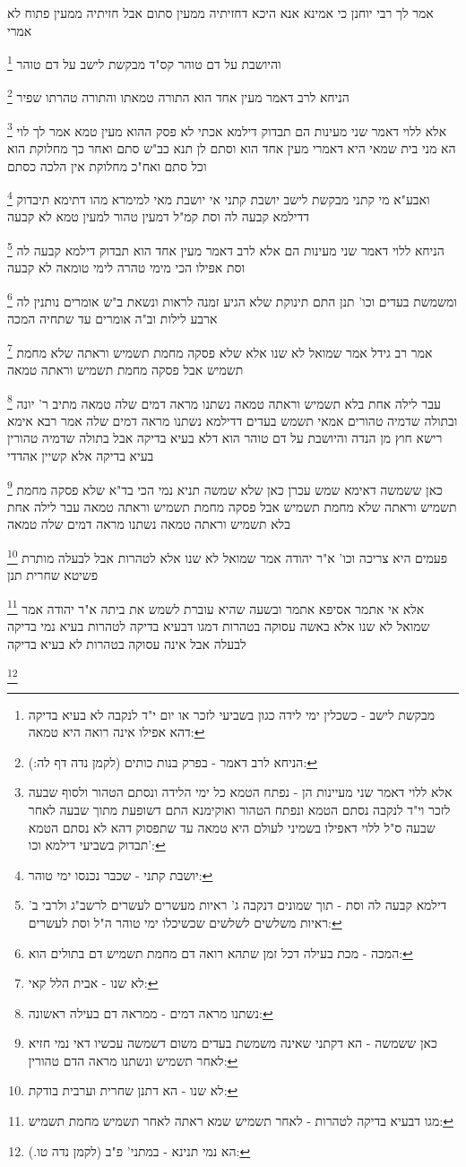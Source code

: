 \documentclass[12pt, openany]{book}
\newcommand{\footnotecomment}[1]{
	\renewcommand\thefootnote{}
	\footnote{#1}}
\newcommand{\commenta}[1]{\footnotecomment{#1}}
\begin{document}
{ אמר לך רבי יוחנן כי אמינא אנא היכא דחזיתיה ממעין סתום אבל חזיתיה ממעין פתוח לא אמרי
\commenta{מבקשת לישב - כשכלין ימי לידה כגון בשביעי לזכר או יום י"ד לנקבה לא בעיא בדיקה דהא אפילו אינה רואה היא טמאה:}
והיושבת על דם טוהר קס"ד מבקשת לישב על דם טוהר 
\commenta{הניחא לרב דאמר - בפרק בנות כותים (לקמן נדה דף לה:):}
הניחא לרב דאמר מעין אחד הוא התורה טמאתו והתורה טהרתו שפיר
\commenta{אלא ללוי דאמר שני מעיינות הן - נפתח הטמא כל ימי הלידה ונסתם הטהור ולסוף שבעה לזכר וי"ד לנקבה נסתם הטמא ונפתח הטהור ואוקימנא התם דשופעת מתוך שבעה לאחר שבעה ס"ל ללוי דאפילו בשמיני לעולם היא טמאה עד שתפסוק דהא לא נסתם הטמא תבדוק בשביעי דילמא וכו':}
אלא ללוי דאמר שני מעינות הם תבדוק דילמא אכתי לא פסק ההוא מעין טמא אמר לך לוי הא מני
בית שמאי היא דאמרי מעין אחד הוא וסתם לן תנא כב"ש סתם ואחר כך מחלוקת הוא וכל סתם ואח"כ מחלוקת אין הלכה כסתם 
\commenta{יושבת קתני - שכבר נכנסו ימי טוהר:}
ואבע"א מי קתני מבקשת לישב יושבת קתני אי יושבת מאי למימרא מהו דתימא תיבדוק דדילמא קבעה לה וסת קמ"ל דמעין טהור למעין טמא לא קבעה 
\commenta{דילמא קבעה לה וסת - תוך שמונים דנקבה ג' ראיות מעשרים לעשרים לרשב"ג ולרבי ב' ראיות משלשים לשלשים שכשיכלו ימי טוהר ה"ל וסת לעשרים:}
הניחא ללוי דאמר שני מעינות הם אלא לרב דאמר מעין אחד הוא תבדוק דילמא קבעה לה וסת אפילו הכי מימי טהרה לימי טומאה לא קבעה
\commenta{המכה - מכת בעילה דכל זמן שתהא רואה דם מחמת תשמיש דם בתולים הוא:}
ומשמשת בעדים וכו' תנן התם תינוקת שלא הגיע זמנה לראות ונשאת ב"ש אומרים נותנין לה ארבע לילות וב"ה אומרים עד שתחיה המכה 
\commenta{לא שנו - אבית הלל קאי:}
אמר רב גידל אמר שמואל לא שנו אלא שלא פסקה מחמת תשמיש וראתה שלא מחמת תשמיש אבל פסקה מחמת תשמיש וראתה טמאה 
\commenta{נשתנו מראה דמים - ממראה דם בעילה ראשונה:}
עבר לילה אחת בלא תשמיש וראתה טמאה נשתנו מראה דמים שלה טמאה מתיב ר' יונה ובתולה שדמיה טהורים אמאי תשמש בעדים דדילמא נשתנו מראה דמים שלה 
אמר רבא אימא רישא חוץ מן הנדה והיושבת על דם טוהר הוא דלא בעיא בדיקה אבל בתולה שדמיה טהורין בעיא בדיקה אלא קשיין אהדדי 
\commenta{כאן ששמשה - הא דקתני שאינה משמשת בעדים משום דשמשה עכשיו דאי נמי חזיא לאחר תשמיש ונשתנו מראה הדם טהורין:}
כאן ששמשה דאימא שמש עכרן כאן שלא שמשה 
תניא נמי הכי בד"א שלא פסקה מחמת תשמיש וראתה שלא מחמת תשמיש
אבל פסקה מחמת תשמיש וראתה טמאה עבר לילה אחת בלא תשמיש וראתה טמאה נשתנו מראה דמים שלה טמאה 
\commenta{לא שנו - הא דתנן שחרית וערבית בודקת:}
פעמים היא צריכה וכו' א"ר יהודה אמר שמואל לא שנו אלא לטהרות אבל לבעלה מותרת פשיטא שחרית תנן 
\commenta{מגו דבעיא בדיקה לטהרות - לאחר תשמיש שמא ראתה לאחר תשמיש מחמת תשמיש:}
אלא אי אתמר אסיפא אתמר ובשעה שהיא עוברת לשמש את ביתה א"ר יהודה אמר שמואל לא שנו אלא באשה עסוקה בטהרות דמגו דבעיא בדיקה לטהרות בעיא נמי בדיקה לבעלה אבל אינה עסוקה בטהרות לא בעיא בדיקה 
\commenta{הא נמי תנינא - במתני' פ"ב (לקמן נדה טו.):}
}
\end{document}

